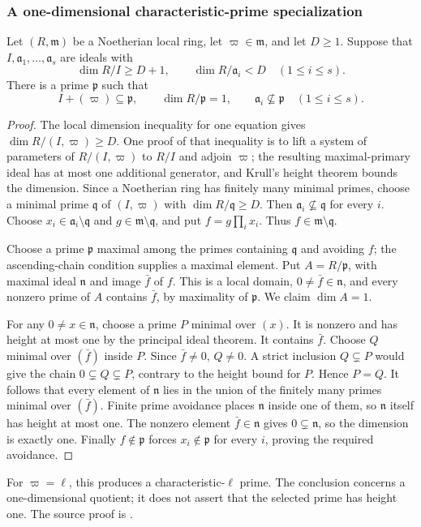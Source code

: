 \subsubsection{A one-dimensional characteristic-prime specialization}
\begin{srlemma}\label{lem:sr-nice-prime}
Let $(R,\mathfrak m)$ be a Noetherian local ring, let
$\varpi\in\mathfrak m$, and let $D\ge1$.
Suppose that $I,\mathfrak a_1,\ldots,\mathfrak a_s$ are ideals with
\[
 \dim R/I\ge D+1,\qquad
                  \dim R/\mathfrak a_i<D\quad(1\le i\le s).
\]
There is a prime $\mathfrak p$ such that
\[
 I+(\varpi)\subseteq\mathfrak p,\qquad
 \dim R/\mathfrak p=1,\qquad
                 \mathfrak a_i\not\subseteq\mathfrak p
                              \quad(1\le i\le s).
\]
\end{srlemma}
\begin{proof}
The local dimension inequality for one equation gives
$\dim R/(I,\varpi)\ge D$.
One proof of that inequality is to lift a system of parameters of
$R/(I,\varpi)$ to $R/I$ and adjoin $\varpi$; the resulting maximal-primary
ideal has at most one additional generator, and Krull's height theorem
bounds the dimension. Since a Noetherian ring has finitely many minimal
primes, choose a minimal prime $\mathfrak q$ of $(I,\varpi)$ with
$\dim R/\mathfrak q\ge D$.
Then $\mathfrak a_i\not\subseteq\mathfrak q$ for every $i$.
Choose $x_i\in\mathfrak a_i\setminus\mathfrak q$ and
$g\in\mathfrak m\setminus\mathfrak q$, and put $f=g\prod_i x_i$.
Thus $f\in\mathfrak m\setminus\mathfrak q$.

Choose a prime $\mathfrak p$ maximal among the primes containing
$\mathfrak q$ and avoiding $f$; the ascending-chain condition supplies
a maximal element. Put $A=R/\mathfrak p$, with maximal ideal
$\mathfrak n$ and image $\bar f$ of $f$.
This is a local domain, $0\ne\bar f\in\mathfrak n$, and every nonzero
prime of $A$ contains $\bar f$, by maximality of $\mathfrak p$.
We claim $\dim A=1$.

For any $0\ne x\in\mathfrak n$, choose a prime $P$ minimal over $(x)$.
It is nonzero and has height at most one by the principal ideal theorem.
It contains $\bar f$. Choose $Q$ minimal over $(\bar f)$ inside $P$.
Since $\bar f\ne0$, $Q\ne0$. A strict inclusion $Q\subsetneq P$ would
give the chain $0\subsetneq Q\subsetneq P$, contrary to the height
bound for $P$. Hence $P=Q$.
It follows that every element of $\mathfrak n$ lies in the union of
the finitely many primes minimal over $(\bar f)$.
Finite prime avoidance places $\mathfrak n$ inside one of them, so
$\mathfrak n$ itself has height at most one.
The nonzero element $\bar f\in\mathfrak n$ gives
$0\subsetneq\mathfrak n$, so the dimension is exactly one.
Finally $f\notin\mathfrak p$ forces
$x_i\notin\mathfrak p$ for every $i$, proving the required avoidance.
\end{proof}
For $\varpi=\ell$, this produces a characteristic-$\ell$ prime.
The conclusion concerns a one-dimensional quotient; it does not assert
that the selected prime has height one.
The source proof is
\href{https://github.com/ChristianKudeba/alpoge-rh-verification/blob/alpoge-source-7cbf7a0c/src/Development/AutomorphicArithmetic/AutomorphicVarieties/CurveDVRSpecialization/NicePrimeEx.lean}
{}.

